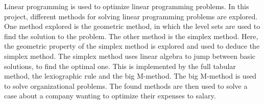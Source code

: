 
Linear programming is used to optimize linear programming problems. In this project, different methods for solving linear programming problems are explored. One method explored is the geometric method, in which the level sets are used to find the solution to the problem. The other method is the simplex method. Here, the geometric property of the simplex method is explored and used to deduce the simplex method. The simplex method uses linear algebra to jump between basic solutions, to find the optimal one. This is implemented by the full tabular method, the lexiographic rule and the big M-method. The big M-method is used to solve organizational problems. The found methods are then used to solve a case about a company wanting to optimize their expenses to salary. 